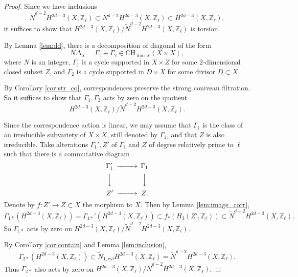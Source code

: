 \documentclass{amsart}
\theoremstyle{definition}
\theoremstyle{remark}
\newcommand{\mbb}{\mathbb}
\newcommand{\ZZ}{\mbb{Z}}
\newcommand{\cyl}{\text{cyl}}
\begin{document}
\begin{proof}
Since we have inclusions $$\tilde{N}^{d-2}H^{2d-3}(X, \ZZ_\ell) \subset {N}^{d-2}H^{2d-3}(X, \ZZ_\ell)\subset H^{2d-3}(X, \ZZ_\ell),$$
it suffices to show that $H^{2d-3}(X, \ZZ_\ell)/\tilde{N}^{d-2}H^{2d-3}(X, \ZZ_\ell)$ is torsion.


    By Lemma \ref{lem:dd}, there is a decomposition of diagonal of the form
    \[
    N \Delta_X=\Gamma_1+\Gamma_2 \in \text{CH}_{\dim X}(X \times X),
    \]
    where $N$ is an integer, $\Gamma_1$ is a cycle supported in $X \times Z$ for some $2$-dimensional closed subset $Z$, and $\Gamma_2$ is a cycle supported in $D\times X$ for some divisor $D \subset X$.

    By Corollary \ref{cor:str_co},  correspondences preserve the strong coniveau filtration. So it suffices to show that $\Gamma_1, \Gamma_2$ acts by zero on the quotient
    \[
    H^{2d-3}(X, \ZZ_\ell)/\tilde{N}^{d-2}H^{2d-3}(X, \ZZ_\ell).
    \]
    
    Since the correspondence action is linear, we may assume that $\Gamma_1$ is the class of an irreducible subvariety of $X\times X$, still denoted by $\Gamma_1$, and that $Z$ is also irreducible.
    Take alterations $\Gamma_1', Z'$ of $\Gamma_1$ and $Z$ of degree relatively prime to $\ell$ such that there is a commutative diagram
    \[
    \begin{CD}
       \Gamma_1' @>>> \Gamma_1\\
       @VVV @VVV\\
       Z' @>>>Z.
    \end{CD}
     \] Denote by $f: Z' \to Z \subset X$ the morphism to $X$. 
    Then by Lemma \ref{lem:image_corr},
    \[
    \Gamma_{1*}(H^{2d-3}(X, \ZZ_\ell))=\Gamma_{1*}'(H^{2d-3}(X, \ZZ_\ell))\subset f_*(H_3(Z', \ZZ_\ell))\subset \tilde{N}^{d-2}H^{2d-3}(X, \ZZ_\ell).\]
    So $\Gamma_{1*}$ acts by zero on $H^{2d-3}(X, \ZZ_\ell)/\tilde{N}^{d-2}H^{2d-3}(X, \ZZ_\ell)$. 
    
    By Corollary \ref{cor:contain} and Lemma \ref{lem:inclusion},
    \[
    \Gamma_{2*}(H^{2d-3}(X, \ZZ_\ell))\subset \tilde{N}_{1, \cyl}H^{2d-3}(X, \ZZ_\ell) = \tilde{N}^{d-2}H^{2d-3}(X, \ZZ_\ell).
    \]
    Thus $\Gamma_{2*}$ also acts by zero on $H^{2d-3}(X, \ZZ_\ell)/\tilde{N}^{d-2}H^{2d-3}(X, \ZZ_\ell)$. 
\end{proof}
\end{document}
